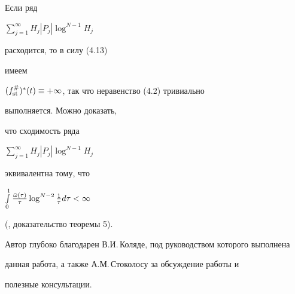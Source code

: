  


\begin{note} Если ряд 


$\sum\limits^\infty_{j=1}H_j|P_j|\log^{N-1}H_j$ 


расходится, то в силу (4.13) 


имеем 


$(f_{\operatorname{st}}^\#)^*(t)\equiv+\infty$, так что неравенство (4.2) тривиально 


выполняется. Можно доказать, 


что сходимость ряда 


$\sum\limits^\infty_{j=1}H_j|P_j|\log^{N-1}H_j$ 


эквивалентна тому, что 


$\int\limits_0^1\frac{\Bar\omega(\tau)}{\tau}\log^{N-2}\frac{1}{\tau} 


d\tau < \infty$ 


(\cite{Kol3}, доказательство теоремы 5). 


\end{note} 


 


Автор глубоко благодарен В.И.\,Коляде, под руководством которого выполнена 


данная работа, а также А.М.\,Стоколосу за обсуждение работы и 


полезные консультации. 


 


